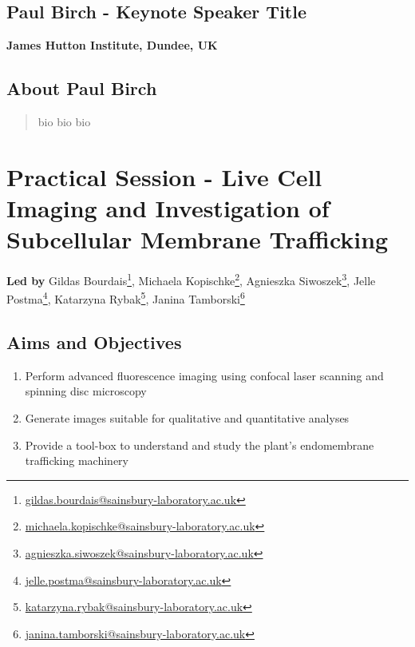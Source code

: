 \documentclass[12pt,]{book}
\providecommand{\tightlist}{%
  \setlength{\itemsep}{0pt}\setlength{\parskip}{0pt}}
\let\rmarkdownfootnote\footnote%
\def\footnote{\protect\rmarkdownfootnote}
\renewcommand{\href}[2]{#2\footnote{\url{#1}}}
\begin{document}
\subsection*{Paul Birch - Keynote Speaker
Title}\label{paul-birch---keynote-speaker-title}

\textbf{James Hutton Institute, Dundee, UK}

\subsection*{About Paul Birch}\label{about-paul-birch}

\begin{quote}
bio bio bio
\end{quote}

\section*{Practical Session - Live Cell Imaging and Investigation of
Subcellular Membrane
Trafficking}\label{practical-session---live-cell-imaging-and-investigation-of-subcellular-membrane-trafficking}

\textbf{Led by} \href{gildas.bourdais@sainsbury-laboratory.ac.uk}{Gildas
Bourdais}, \href{michaela.kopischke@sainsbury-laboratory.ac.uk}{Michaela
Kopischke},
\href{agnieszka.siwoszek@sainsbury-laboratory.ac.uk}{Agnieszka
Siwoszek}, \href{jelle.postma@sainsbury-laboratory.ac.uk}{Jelle Postma},
\href{katarzyna.rybak@sainsbury-laboratory.ac.uk}{Katarzyna Rybak},
\href{janina.tamborski@sainsbury-laboratory.ac.uk}{Janina Tamborski}

\subsection*{Aims and Objectives}\label{aims-and-objectives-4}

\begin{enumerate}
\def\labelenumi{\arabic{enumi}.}
\tightlist
\item
  Perform advanced fluorescence imaging using confocal laser scanning
  and spinning disc microscopy
\item
  Generate images suitable for qualitative and quantitative analyses
\item
  Provide a tool-box to understand and study the plant's endomembrane
  trafficking machinery
\end{enumerate}
\end{document}
